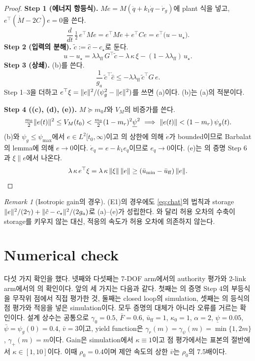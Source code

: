 \documentclass[11pt]{article}\usepackage[margin=1in]{geometry}\usepackage{amsmath,amssymb,amsthm,mathtools}\usepackage{graphicx}\graphicspath{{figures/}{../figures/}{figs/}{./}}\usepackage{enumitem}\usepackage{hyperref}\usepackage{cleveref}\usepackage{tikz}\usetikzlibrary{arrows.meta,positioning,calc,shapes.geometric}\usepackage{float}\usepackage[most]{tcolorbox}\usepackage{kotex}\usepackage{booktabs}\emergencystretch=1.6em\tolerance=2000 \crefname{assumption}{Assumption}{Assumptions}\Crefname{assumption}{Assumption}{Assumptions}\crefname{definition}{Definition}{Definitions}\Crefname{definition}{Definition}{Definitions}\crefname{proposition}{Proposition}{Propositions}\Crefname{proposition}{Proposition}{Propositions}\crefname{fact}{Fact}{Facts}\Crefname{fact}{Fact}{Facts} \newtheorem{assumption}{Assumption}\newtheorem{definition}{Definition}\newtheorem{lemma}{Lemma}\newtheorem{proposition}{Proposition}\newtheorem{theorem}{Theorem}\newtheorem{corollary}{Corollary}\newtheorem{fact}{Fact}\theoremstyle{remark}\newtheorem{remark}{Remark} \newcommand{\R}{\mathbb{R}}\newcommand{\U}{\mathcal U}
\begin{document}
\begin{proof}
\textbf{Step 1 (에너지 항등식).} $M\dot e=M(\ddot q+k_1\dot q-\dot r_g)$에 plant 식을 넣고, $e^\top(\dot M-2C)e=0$을 쓴다.
\[
\frac{d}{dt}\,\tfrac12\,e^\top M e=e^\top M\dot e+e^\top C e=e^\top\big(u-u_\star\big).
\]
\textbf{Step 2 (입력의 분해).} $\tilde c:=\hat c-c_\star$로 둔다.
\[
u-u_\star=\lambda\lambda_{\mathrm{ff}}\,G^\top\tilde c-\lambda\,\kappa\,\xi-(1-\lambda\lambda_{\mathrm{ff}})\,u_\star .
\]
\textbf{Step 3 (상쇄).} (b)를 쓴다.
\[
\frac{1}{g_a}\,\tilde c^\top\dot{\hat c}\le-\lambda\lambda_{\mathrm{ff}}\,\tilde c^\top G\,e .
\]
Step 1--3을 더하고 $e^\top\xi=\lVert e\rVert^2/(\psi_g^2-\lVert e\rVert^2)$를 쓰면 (a)이다. (b)는 (a)의 적분이다.

\textbf{Step 4 ((c), (d), (e)).} $M\succeq m_0I$와 $V_M$의 비증가를 쓴다.
\[
\tfrac{m_0}{2}\norm{e(t)}^2\le V_M(t_0)<\tfrac{m_0}{2}(1-m_r)^2\underline\psi^2\ \Longrightarrow\ \norm{e(t)}<(1-m_r)\,\psi_g(t).
\]
(b)와 $\psi_g\le\psi_{\max}$에서 $e\in L^2[t_0,\infty)$이고 의 상한에 의해 $\dot e$가 bounded이므로 Barbalat의 lemma에 의해 $e\to0$이다. $\dot e_q=e-k_1e_q$이므로 $e_q\to0$이다. (e)는 의 증명 Step 6과 $\xi\parallel e$에서 나온다.
\[
\lambda\,\kappa\,e^\top\xi=\lambda\,\kappa\,\lVert \xi\rVert\,\lVert e\rVert\ge(\bar u_{\min}-\bar u_{\mathrm{ff}})\,\lVert e\rVert.
\]
\end{proof}

\begin{remark}[Isotropic gain의 경우]
(E1)의 경우에도 \eqref{eq:chat}의 법칙과 storage $\lVert e\rVert^2/(2\gamma)+\lVert \hat c-c_\star\rVert^2/(2g_a)$로 (a)--(e)가 성립한다. 와 달리 허용 오차의 수축이 storage를 키우지 않는 대신, 적응의 속도가 허용 오차에 의존하지 않는다.
\end{remark}

\section{Numerical check}
\label{sec:num}

다섯 가지 확인을 했다. 넷째와 다섯째는 7-DOF arm에서의 authority 평가와 2-link arm에서의 의 확인이다. 앞의 세 가지는 다음과 같다. 첫째는 의 증명 Step 4의 부등식을 무작위 점에서 직접 평가한 것, 둘째는 closed loop의 simulation, 셋째는 의 등식의 점 평가와 적응을 넣은 simulation이다. 모두 증명의 대체가 아니라 오류를 거르는 확인이다. 설계 상수는 공통으로 $\gamma_0=0.5$, $\bar F=0.6$, $\bar u_{\mathrm{ff}}=1$, $\kappa_0=1$, $\alpha=2$, $\underline\psi=0.05$, $\bar\psi=\psi_g(0)=0.4$, $\bar v=3$이고, yield function은 $\gamma_r(m)=\gamma_\psi(m)=\min\{1,2m\}$, $\gamma_+(m)=m$이다. Gain은 simulation에서 $\kappa\equiv1$이고 점 평가에서는 표본의 절반에서 $\kappa\in[1,10]$이다. 이때 $\rho_0=0.4$이며 제안 속도의 상한 $\bar v$는 $\rho_0$의 7.5배이다.
\end{document}
